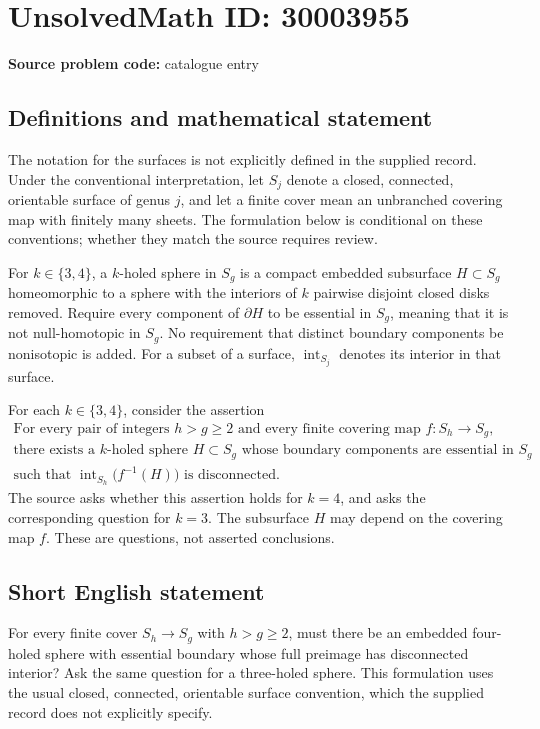 \documentclass[11pt]{article}
\begin{document}
\section*{UnsolvedMath ID: 30003955}
\textbf{Source problem code:} catalogue entry
\subsection{Definitions and mathematical statement}
The notation for the surfaces is not explicitly defined in the supplied record. Under the conventional interpretation, let \(S_j\) denote a closed, connected, orientable surface of genus \(j\), and let a finite cover mean an unbranched covering map with finitely many sheets. The formulation below is conditional on these conventions; whether they match the source requires review.

For \(k\in\{3,4\}\), a \(k\)-holed sphere in \(S_g\) is a compact embedded subsurface \(H\subset S_g\) homeomorphic to a sphere with the interiors of \(k\) pairwise disjoint closed disks removed. Require every component of \(\partial H\) to be essential in \(S_g\), meaning that it is not null-homotopic in \(S_g\). No requirement that distinct boundary components be nonisotopic is added. For a subset of a surface, \(\operatorname{int}_{S_j}\) denotes its interior in that surface.

For each \(k\in\{3,4\}\), consider the assertion
\[
\begin{gathered}
\text{For every pair of integers }h>g\geq 2
\text{ and every finite covering map }f:S_h\longrightarrow S_g,\\
\text{there exists a }k\text{-holed sphere }H\subset S_g
\text{ whose boundary components are essential in }S_g\\
\text{such that }\operatorname{int}_{S_h}\!\bigl(f^{-1}(H)\bigr)
\text{ is disconnected.}
\end{gathered}
\]
The source asks whether this assertion holds for \(k=4\), and asks the corresponding question for \(k=3\). The subsurface \(H\) may depend on the covering map \(f\). These are questions, not asserted conclusions.
\subsection{Short English statement}
For every finite cover \(S_h\to S_g\) with \(h>g\geq2\), must there be an embedded four-holed sphere with essential boundary whose full preimage has disconnected interior? Ask the same question for a three-holed sphere. This formulation uses the usual closed, connected, orientable surface convention, which the supplied record does not explicitly specify.
\end{document}
